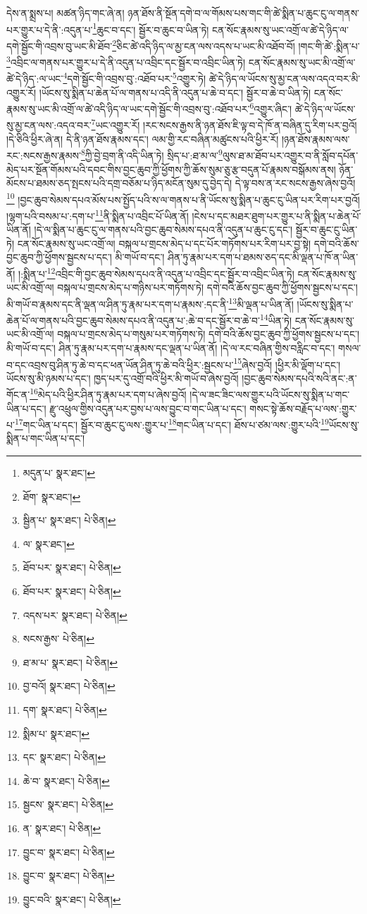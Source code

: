 དེས་ན་སྨྲས་པ། མཚན་ཉིད་གང་ཞེ་ན། ཉན་ཐོས་ནི་སྔོན་དགེ་བ་ལ་གོམས་པས་གང་གི་ཚེ་སྨིན་པ་ཆུང་ངུ་ལ་གནས་པར་གྱུར་པ་དེ་ནི་:འདུན་པ་\footnote{མདུན་པ་  སྣར་ཐང་། }ཆུང་བ་དང་། སྦྱོར་བ་ཆུང་བ་ཡིན་ཏེ། ངན་སོང་རྣམས་སུ་ཡང་འགྲོ་ལ་ཚེ་དེ་ཉིད་ལ་དགེ་སྦྱོང་གི་འབྲས་བུ་ཡང་མི་ཐོབ་\footnote{ཐོག་  སྣར་ཐང་། }ཅིང་ཚེ་འདི་ཉིད་ལ་མྱ་ངན་ལས་འདས་པ་ཡང་མི་འཐོབ་བོ། །གང་གི་ཚེ་:སྨིན་པ་\footnote{སྦྱིན་པ་  སྣར་ཐང་།  པེ་ཅིན། }འབྲིང་ལ་གནས་པར་གྱུར་པ་དེ་ནི་འདུན་པ་འབྲིང་དང་སྦྱོར་བ་འབྲིང་ཡིན་ཏེ། ངན་སོང་རྣམས་སུ་ཡང་མི་འགྲོ་ལ་ཚེ་དེ་ཉིད་:ལ་ཡང་\footnote{ལ་  སྣར་ཐང་། }དགེ་སྦྱོང་གི་འབྲས་བུ་:འཐོབ་པར་\footnote{ཐོབ་པར་  སྣར་ཐང་།  པེ་ཅིན། }འགྱུར་ཏེ། ཚེ་དེ་ཉིད་ལ་ཡོངས་སུ་མྱ་ངན་ལས་འདའ་བར་མི་འགྱུར་རོ། །ཡོངས་སུ་སྨིན་པ་ཆེན་པོ་ལ་གནས་པ་འདི་ནི་འདུན་པ་ཆེ་བ་དང་། སྦྱོར་བ་ཆེ་བ་ཡིན་ཏེ། ངན་སོང་རྣམས་སུ་ཡང་མི་འགྲོ་ལ་ཚེ་འདི་ཉིད་ལ་ཡང་དགེ་སྦྱོང་གི་འབྲས་བུ་:འཐོབ་པར་\footnote{ཐོབ་པར་  སྣར་ཐང་།  པེ་ཅིན། }འགྱུར་ཞིང་། ཚེ་དེ་ཉིད་ལ་ཡོངས་སུ་མྱ་ངན་ལས་:འདའ་བར་\footnote{འདས་པར་  སྣར་ཐང་།  པེ་ཅིན། }ཡང་འགྱུར་རོ། །རང་སངས་རྒྱས་ནི་ཉན་ཐོས་ཇི་ལྟ་བ་དེ་ཁོ་ན་བཞིན་དུ་རིག་པར་བྱའོ། །དེ་ཅིའི་ཕྱིར་ཞེ་ན། དེ་ནི་ཉན་ཐོས་རྣམས་དང་། ལམ་གྱི་རང་བཞིན་མཚུངས་པའི་ཕྱིར་རོ། །ཉན་ཐོས་རྣམས་ལས་རང་:སངས་རྒྱས་རྣམས་\footnote{སངས་རྒྱས་  པེ་ཅིན། }ཀྱི་བྱེ་བྲག་ནི་འདི་ཡིན་ཏེ། སྲིད་པ་:ཐ་མ་ལ་\footnote{ཐ་མ་པ་  སྣར་ཐང་།  པེ་ཅིན། }ལུས་ཐ་མ་ཐོབ་པར་འགྱུར་བ་ནི་སློབ་དཔོན་མེད་པར་སྔོན་གོམས་པའི་དབང་གིས་བྱང་ཆུབ་ཀྱི་ཕྱོགས་ཀྱི་ཆོས་སུམ་ཅུ་རྩ་བདུན་པོ་རྣམས་བསྒོམས་ནས། ཉོན་མོངས་པ་ཐམས་ཅད་སྤངས་པའི་དགྲ་བཅོམ་པ་ཉིད་མངོན་སུམ་དུ་བྱེད་དེ། དེ་ལྟ་བས་ན་རང་སངས་རྒྱས་ཞེས་བྱའོ།\footnote{བྱ་བའོ།  སྣར་ཐང་།  པེ་ཅིན། } །བྱང་ཆུབ་སེམས་དཔའ་མོས་པས་སྤྱོད་པའི་ས་ལ་གནས་པ་ནི་ཡོངས་སུ་སྨིན་པ་ཆུང་ངུ་ཡིན་པར་རིག་པར་བྱའོ། །ལྷག་པའི་བསམ་པ་:དག་པ་\footnote{དག་  སྣར་ཐང་།  པེ་ཅིན། }ནི་སྨིན་པ་འབྲིང་པོ་ཡིན་ནོ། །ངེས་པ་དང་མཐར་ཐུག་པར་གྱུར་པ་ནི་སྨིན་པ་ཆེན་པོ་ཡིན་ནོ། །དེ་ལ་སྨིན་པ་ཆུང་ངུ་ལ་གནས་པའི་བྱང་ཆུབ་སེམས་དཔའ་ནི་འདུན་པ་ཆུང་ངུ་དང་། སྦྱོར་བ་ཆུང་ངུ་ཡིན་ཏེ། ངན་སོང་རྣམས་སུ་ཡང་འགྲོ་ལ། བསྐལ་པ་གྲངས་མེད་པ་དང་པོར་གཏོགས་པར་རིག་པར་བྱ་སྟེ། དགེ་བའི་ཆོས་བྱང་ཆུབ་ཀྱི་ཕྱོགས་སྦྱངས་པ་དང་། མི་གཡོ་བ་དང་། ཤིན་ཏུ་རྣམ་པར་དག་པ་ཐམས་ཅད་དང་མི་ལྡན་པ་ཁོ་ན་ཡིན་ནོ། །:སྨིན་པ་\footnote{སྨིམ་པ་  སྣར་ཐང་། }འབྲིང་གི་བྱང་ཆུབ་སེམས་དཔའ་ནི་འདུན་པ་འབྲིང་དང་སྦྱོར་བ་འབྲིང་ཡིན་ཏེ། ངན་སོང་རྣམས་སུ་ཡང་མི་འགྲོ་ལ། བསྐལ་པ་གྲངས་མེད་པ་གཉིས་པར་གཏོགས་ཏེ། དགེ་བའི་ཆོས་བྱང་ཆུབ་ཀྱི་ཕྱོགས་སྦྱངས་པ་དང་། མི་གཡོ་བ་རྣམས་དང་ནི་ལྡན་ལ་ཤིན་ཏུ་རྣམ་པར་དག་པ་རྣམས་:དང་ནི་\footnote{དང་  སྣར་ཐང་།  པེ་ཅིན། }མི་ལྡན་པ་ཡིན་ནོ། །ཡོངས་སུ་སྨིན་པ་ཆེན་པོ་ལ་གནས་པའི་བྱང་ཆུབ་སེམས་དཔའ་ནི་འདུན་པ་:ཆེ་བ་དང་སྦྱོར་བ་ཆེ་བ་\footnote{ཆེ་བ་  སྣར་ཐང་།  པེ་ཅིན། }ཡིན་ཏེ། ངན་སོང་རྣམས་སུ་ཡང་མི་འགྲོ་ལ། བསྐལ་པ་གྲངས་མེད་པ་གསུམ་པར་གཏོགས་ཏེ། དགེ་བའི་ཆོས་བྱང་ཆུབ་ཀྱི་ཕྱོགས་སྦྱངས་པ་དང་། མི་གཡོ་བ་དང་། ཤིན་ཏུ་རྣམ་པར་དག་པ་རྣམས་དང་ལྡན་པ་ཡིན་ནོ། །དེ་ལ་རང་བཞིན་གྱིས་བརླིང་བ་དང་། གསལ་བ་དང་འབྲས་བུ་ཤིན་ཏུ་ཆེ་བ་དང་ཕན་ཡོན་ཤིན་ཏུ་ཆེ་བའི་ཕྱིར་:སྦྱངས་པ་\footnote{སྦྱངས་  སྣར་ཐང་།  པེ་ཅིན། }ཞེས་བྱའོ། །ཕྱིར་མི་ལྡོག་པ་དང་། ཡོངས་སུ་མི་ཉམས་པ་དང་། ཁྱད་པར་དུ་འགྲོ་བའི་ཕྱིར་མི་གཡོ་བ་ཞེས་བྱའོ། །བྱང་ཆུབ་སེམས་དཔའི་སའི་ནང་:ན་གོང་ན་\footnote{ན་  སྣར་ཐང་།  པེ་ཅིན། }མེད་པའི་ཕྱིར་ཤིན་ཏུ་རྣམ་པར་དག་པ་ཞེས་བྱའོ། །དེ་ལ་ཟང་ཟིང་ལས་གྱུར་པའི་ཡོངས་སུ་སྨིན་པ་གང་ཡིན་པ་དང་། རྫུ་འཕྲུལ་གྱིས་འདུན་པར་བྱས་པ་ལས་བྱུང་བ་གང་ཡིན་པ་དང་། གསང་སྟེ་ཆོས་བརྗོད་པ་ལས་:གྱུར་པ་\footnote{བྱུང་བ་  སྣར་ཐང་།  པེ་ཅིན། }གང་ཡིན་པ་དང་། སྦྱོར་བ་ཆུང་ངུ་ལས་:གྱུར་པ་\footnote{བྱུང་བ་  སྣར་ཐང་།  པེ་ཅིན། }གང་ཡིན་པ་དང་། ཐོས་པ་ཙམ་ལས་:གྱུར་པའི་\footnote{བྱུང་བའི་  སྣར་ཐང་།  པེ་ཅིན། }ཡོངས་སུ་སྨིན་པ་གང་ཡིན་པ་དང་། 